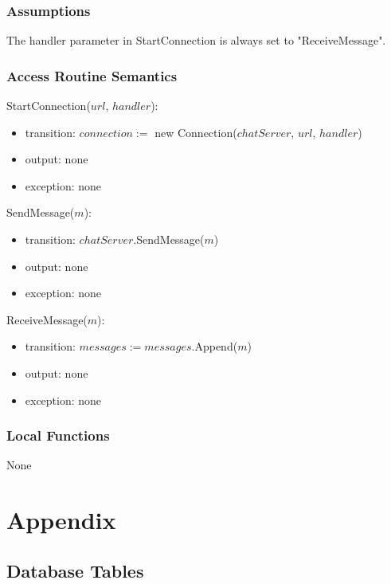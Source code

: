 \documentclass[12pt, titlepage]{article}
\begin{document}
\subsubsection{Assumptions}

The handler parameter in StartConnection is always set to "ReceiveMessage".

\subsubsection{Access Routine Semantics}

\noindent StartConnection($url$, $handler$):
\begin{itemize}
\item transition: $connection := $ new Connection($chatServer$, $url$, $handler$)
\item output: none
\item exception: none
\end{itemize}

\noindent SendMessage($m$):
\begin{itemize}
\item transition: $chatServer$.SendMessage($m$)
\item output: none
\item exception: none
\end{itemize}

\noindent ReceiveMessage($m$):
\begin{itemize}
\item transition: $messages := messages$.Append($m$)
\item output: none
\item exception: none
\end{itemize}

\subsubsection{Local Functions}

None

\newpage

\section{Appendix} \label{Appendix}
\subsection{Database Tables}
\end{document}
